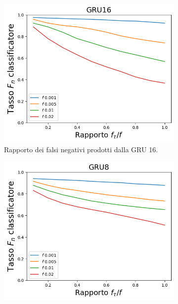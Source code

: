 \documentclass[../../main.tex]{subfiles}
\begin{document}
    \begin{figure}[H]
        \centering
        \begin{subfigure}[b]{0.32\textwidth}
            \centering
            \includegraphics[width = \textwidth]{immagini/7/LBF/GRU16_FNR.png}
            \caption{Rapporto dei falsi negativi prodotti dalla GRU 16.}
            \label{fig:LBFFNR_GRU16}
        \end{subfigure}
        \begin{subfigure}[b]{0.32\textwidth}
            \centering
            \includegraphics[width = \textwidth]{immagini/7/LBF/GRU8_FNR.png}

\end{subfigure}
\end{figure}
\end{document}

